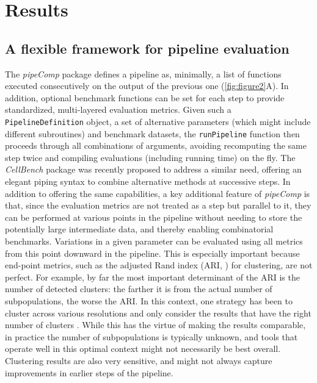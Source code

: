 \documentclass{bmcart}
\begin{document}
\section*{Results}

\subsection*{A flexible framework for pipeline evaluation}

The \textit{pipeComp} package defines a pipeline as, minimally, a list of functions executed consecutively on the output of the previous one (\ref{fig:figure2}A). In addition, optional benchmark functions can be set for each step to provide standardized, multi-layered evaluation metrics. Given such a \texttt{PipelineDefinition} object, a set of alternative parameters (which might include different subroutines) and benchmark datasets, the \texttt{runPipeline} function then proceeds through all combinations of arguments, avoiding recomputing the same step twice and compiling evaluations (including running time) on the fly. The \textit{CellBench} package was recently proposed to address a similar need\citep{su_cellbench}, offering an elegant piping syntax to combine alternative methods at successive steps. In addition to offering the same capabilities, a key additional feature of \textit{pipeComp} is that, since the evaluation metrics are not treated as a step but parallel to it, they can be performed at various points in the pipeline without needing to store the potentially large intermediate data, and thereby enabling combinatorial benchmarks. Variations in a given parameter can be evaluated using all metrics from this point downward in the pipeline. This is especially important because end-point metrics, such as the adjusted Rand index (ARI, \citep{HubertARI1985}) for clustering, are not perfect. For example, by far the most important determinant of the ARI is the number of detected clusters: the farther it is from the actual number of subpopulations, the worse the ARI. In this context, one strategy has been to cluster across various resolutions and only consider the results that have the right number of clusters \citep{duoClustering2018}. While this has the virtue of making the results comparable, in practice the number of subpopulations is typically unknown, and tools that operate well in this optimal context might not necessarily be best overall. Clustering results are also very sensitive, and might not always capture improvements in earlier steps of the pipeline.
\end{document}
